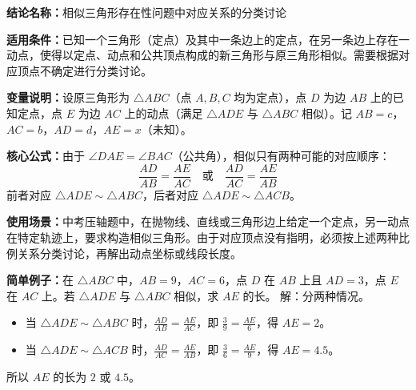 \textbf{结论名称：}相似三角形存在性问题中对应关系的分类讨论

\textbf{适用条件：}已知一个三角形（定点）及其中一条边上的定点，在另一条边上存在一动点，使得以定点、动点和公共顶点构成的新三角形与原三角形相似。需要根据对应顶点不确定进行分类讨论。

\textbf{变量说明：}设原三角形为 \(\triangle ABC\)（点 \(A,B,C\) 均为定点），点 \(D\) 为边 \(AB\) 上的已知定点，点 \(E\) 为边 \(AC\) 上的动点（满足 \(\triangle ADE\) 与 \(\triangle ABC\) 相似）。记 \(AB = c\)，\(AC = b\)，\(AD = d\)，\(AE = x\)（未知）。

\textbf{核心公式：}由于 \(\angle DAE = \angle BAC\)（公共角），相似只有两种可能的对应顺序：
\[
\boxed{
\frac{AD}{AB} = \frac{AE}{AC} \quad \text{或} \quad \frac{AD}{AC} = \frac{AE}{AB}
}
\]
前者对应 \(\triangle ADE \sim \triangle ABC\)，后者对应 \(\triangle ADE \sim \triangle ACB\)。

\textbf{使用场景：}中考压轴题中，在抛物线、直线或三角形边上给定一个定点，另一动点在特定轨迹上，要求构造相似三角形。由于对应顶点没有指明，必须按上述两种比例关系分类讨论，再解出动点坐标或线段长度。

\textbf{简单例子：}在 \(\triangle ABC\) 中，\(AB = 9\)，\(AC = 6\)，点 \(D\) 在 \(AB\) 上且 \(AD = 3\)，点 \(E\) 在 \(AC\) 上。若 \(\triangle ADE\) 与 \(\triangle ABC\) 相似，求 \(AE\) 的长。
解：分两种情况。
\begin{itemize}
\item 当 \(\triangle ADE \sim \triangle ABC\) 时，\(\frac{AD}{AB}=\frac{AE}{AC}\)，即 \(\frac{3}{9}=\frac{AE}{6}\)，得 \(AE=2\)。
\item 当 \(\triangle ADE \sim \triangle ACB\) 时，\(\frac{AD}{AC}=\frac{AE}{AB}\)，即 \(\frac{3}{6}=\frac{AE}{9}\)，得 \(AE=4.5\)。
\end{itemize}
所以 \(AE\) 的长为 \(2\) 或 \(4.5\)。